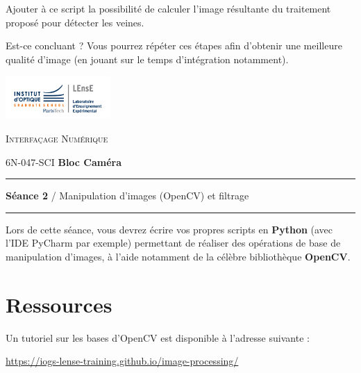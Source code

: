 \documentclass[a4paper,11pt,titlepage]{article} %
\begin{document}
\Manip Ajouter à ce script la possibilité de calculer l'image résultante du traitement proposé pour détecter les veines.

\Quest Est-ce concluant ? Vous pourrez répéter ces étapes afin d'obtenir une meilleure qualité d'image (en jouant sur le temps d'intégration notamment).


\newpage
\strut %
\begin{minipage}[c]{.25\linewidth}
	\includegraphics[width=4cm]{images/Logo-LEnsE.png}
\end{minipage} \hfill
\begin{minipage}[c]{.4\linewidth}

\begin{center}
\vspace{0.3cm}
{\Large \textsc{Interfaçage Numérique}}

\medskip

6N-047-SCI \qquad \textbf{\Large Bloc Caméra}

\end{center}
\end{minipage}\hfill

\vspace{0.5cm}

\noindent \rule{\linewidth}{1pt}

{\noindent\Large \rule[-7pt]{0pt}{30pt} \textbf{Séance 2} / Manipulation d'images (OpenCV) et filtrage} 

\noindent \rule{\linewidth}{1pt}

Lors de cette séance, vous devrez écrire vos propres scripts en \textbf{Python} (avec l'IDE PyCharm par exemple) permettant de réaliser des opérations de base de manipulation d'images, à l'aide notamment de la célèbre bibliothèque \textbf{OpenCV}.

\section{Ressources}

Un tutoriel sur les bases d'OpenCV est disponible à l’adresse suivante : 

\href{https://iogs-lense-training.github.io/image-processing/}{https://iogs-lense-training.github.io/image-processing/}
\end{document}
